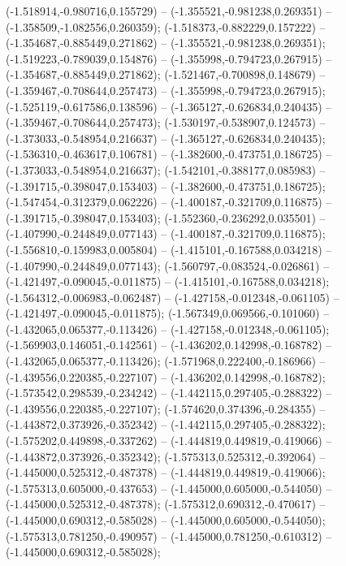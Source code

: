 (-1.518914,-0.980716,0.155729) -- (-1.355521,-0.981238,0.269351) -- (-1.358509,-1.082556,0.260359);
 (-1.518373,-0.882229,0.157222) -- (-1.354687,-0.885449,0.271862) -- (-1.355521,-0.981238,0.269351);
 (-1.519223,-0.789039,0.154876) -- (-1.355998,-0.794723,0.267915) -- (-1.354687,-0.885449,0.271862);
 (-1.521467,-0.700898,0.148679) -- (-1.359467,-0.708644,0.257473) -- (-1.355998,-0.794723,0.267915);
 (-1.525119,-0.617586,0.138596) -- (-1.365127,-0.626834,0.240435) -- (-1.359467,-0.708644,0.257473);
 (-1.530197,-0.538907,0.124573) -- (-1.373033,-0.548954,0.216637) -- (-1.365127,-0.626834,0.240435);
 (-1.536310,-0.463617,0.106781) -- (-1.382600,-0.473751,0.186725) -- (-1.373033,-0.548954,0.216637);
 (-1.542101,-0.388177,0.085983) -- (-1.391715,-0.398047,0.153403) -- (-1.382600,-0.473751,0.186725);
 (-1.547454,-0.312379,0.062226) -- (-1.400187,-0.321709,0.116875) -- (-1.391715,-0.398047,0.153403);
 (-1.552360,-0.236292,0.035501) -- (-1.407990,-0.244849,0.077143) -- (-1.400187,-0.321709,0.116875);
 (-1.556810,-0.159983,0.005804) -- (-1.415101,-0.167588,0.034218) -- (-1.407990,-0.244849,0.077143);
 (-1.560797,-0.083524,-0.026861) -- (-1.421497,-0.090045,-0.011875) -- (-1.415101,-0.167588,0.034218);
 (-1.564312,-0.006983,-0.062487) -- (-1.427158,-0.012348,-0.061105) -- (-1.421497,-0.090045,-0.011875);
 (-1.567349,0.069566,-0.101060) -- (-1.432065,0.065377,-0.113426) -- (-1.427158,-0.012348,-0.061105);
 (-1.569903,0.146051,-0.142561) -- (-1.436202,0.142998,-0.168782) -- (-1.432065,0.065377,-0.113426);
 (-1.571968,0.222400,-0.186966) -- (-1.439556,0.220385,-0.227107) -- (-1.436202,0.142998,-0.168782);
 (-1.573542,0.298539,-0.234242) -- (-1.442115,0.297405,-0.288322) -- (-1.439556,0.220385,-0.227107);
 (-1.574620,0.374396,-0.284355) -- (-1.443872,0.373926,-0.352342) -- (-1.442115,0.297405,-0.288322);
 (-1.575202,0.449898,-0.337262) -- (-1.444819,0.449819,-0.419066) -- (-1.443872,0.373926,-0.352342);
 (-1.575313,0.525312,-0.392064) -- (-1.445000,0.525312,-0.487378) -- (-1.444819,0.449819,-0.419066);
 (-1.575313,0.605000,-0.437653) -- (-1.445000,0.605000,-0.544050) -- (-1.445000,0.525312,-0.487378);
 (-1.575312,0.690312,-0.470617) -- (-1.445000,0.690312,-0.585028) -- (-1.445000,0.605000,-0.544050);
 (-1.575313,0.781250,-0.490957) -- (-1.445000,0.781250,-0.610312) -- (-1.445000,0.690312,-0.585028);
